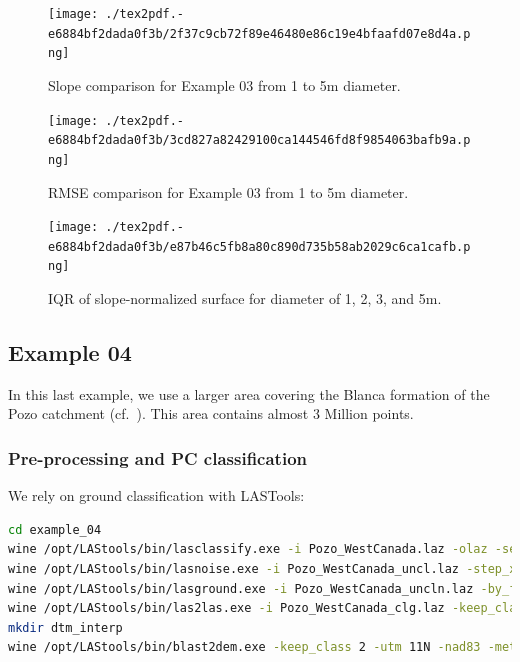 \documentclass[a4paperpaper,,tablecaptionabove]{scrartcl}
\begin{document}
\begin{figure}
\centering
\texttt{[image: ./tex2pdf.-e6884bf2dada0f3b/2f37c9cb72f89e46480e86c19e4bfaafd07e8d4a.png]}
\caption{Slope comparison for Example 03 from 1 to 5m
diameter.\label{Fig:Ex03_lasground_slopeP2_1_2_3_5m}}
\end{figure}

\begin{figure}
\centering
\texttt{[image: ./tex2pdf.-e6884bf2dada0f3b/3cd827a82429100ca144546fd8f9854063bafb9a.png]}
\caption{RMSE comparison for Example 03 from 1 to 5m
diameter.\label{Fig:Ex03_lasground_RMSE_P1_1_2_3_5m}}
\end{figure}

\begin{figure}
\centering
\texttt{[image: ./tex2pdf.-e6884bf2dada0f3b/e87b46c5fb8a80c890d735b58ab2029c6ca1cafb.png]}
\caption{IQR of slope-normalized surface for diameter of 1, 2, 3, and
5m.\label{Fig:Ex03_lasground_dz_IQR_1_2_3_5m}}
\end{figure}

\hypertarget{example-04}{%
\subsection{Example 04}\label{example-04}}

In this last example, we use a larger area covering the Blanca formation
of the Pozo catchment (cf.~\label{Fig:Pozo_DEM_examples_map}). This area
contains almost 3 Million points.

\hypertarget{pre-processing-and-pc-classification-1}{%
\subsubsection{Pre-processing and PC
classification}\label{pre-processing-and-pc-classification-1}}

We rely on ground classification with LASTools:

\begin{lstlisting}[language=bash]
cd example_04
wine /opt/LAStools/bin/lasclassify.exe -i Pozo_WestCanada.laz -olaz -set_user_data 0 -set_classification 0 -o Pozo_WestCanada_uncl.laz
wine /opt/LAStools/bin/lasnoise.exe -i Pozo_WestCanada_uncl.laz -step_xy 2 -step_z 1 -isolated 5 -olaz -o Pozo_WestCanada_uncln.laz
wine /opt/LAStools/bin/lasground.exe -i Pozo_WestCanada_uncln.laz -by_flightline -wilderness -extra_fine -offset 0.25 -stddev 20 -step 1 -spike 0.5 -bulge 0.5 -olaz -o Pozo_WestCanada_clg.laz 
wine /opt/LAStools/bin/las2las.exe -i Pozo_WestCanada_clg.laz -keep_class 2 -olaz -o Pozo_WestCanada_clg_cl2.laz 
mkdir dtm_interp
wine /opt/LAStools/bin/blast2dem.exe -keep_class 2 -utm 11N -nad83 -meter -elevation_meter -merged -step 1 -i Pozo_WestCanada_clg_cl2.laz -o dtm_interp/Pozo_WestCanada_clg_cl2_1m.tif
\end{lstlisting}
\end{document}
